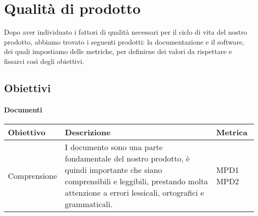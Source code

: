 \chapter{Qualità di prodotto}
Dopo aver individuato i fattori di qualità necessari per il ciclo di vita del nostro prodotto, abbiamo trovato i seguenti prodotti: la documentazione
e il software, dei quali impostiamo delle metriche, per definirne dei valori da rispettare e fissarci così degli obiettivi.
\section{Obiettivi}
\subsubsection{Documenti}
\begin{center}
  \begin{tabular}{|p{2.5cm}|p{8cm}|p{1.5cm}|} \hline
    \textbf{Obiettivo} & \textbf{Descrizione} & \textbf{Metrica}  \\ \hline
    Comprensione & I documento sono una parte fondamentale del nostro prodotto, è quindi importante che siano comprensibili e leggibili, prestando molta attenzione
    a errori lessicali, ortografici e grammaticali.  & MPD1 \newline MPD2       \\ \hline
  \end{tabular}
\end{center}

